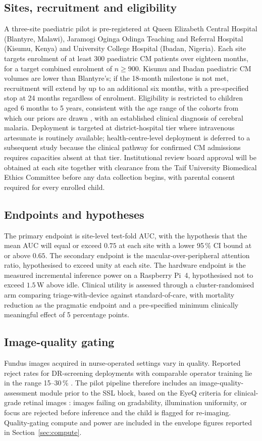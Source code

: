 \documentclass[twocolumn,10pt]{article}
\begin{document}
\subsection{Sites, recruitment and eligibility}
A three-site paediatric pilot is pre-registered at Queen
Elizabeth Central Hospital (Blantyre, Malawi), Jaramogi Oginga
Odinga Teaching and Referral Hospital (Kisumu, Kenya) and
University College Hospital (Ibadan, Nigeria). Each site targets
enrolment of at least 300 paediatric CM patients over eighteen
months, for a target combined enrolment of $n \geq 900$. Kisumu
and Ibadan paediatric CM volumes are lower than Blantyre's; if
the 18-month milestone is not met, recruitment will extend by up
to an additional six months, with a pre-specified stop at
24 months regardless of enrolment. Eligibility is restricted to
children aged 6 months to 5 years, consistent with the age range
of the cohorts from which our priors are drawn
\cite{Beare2006,Beare2009}, with an established clinical
diagnosis of cerebral malaria. Deployment is targeted at
district-hospital tier where intravenous artesunate is routinely
available; health-centre-level deployment is deferred to a
subsequent study because the clinical pathway for confirmed CM
admissions requires capacities absent at that tier.
Institutional review board approval will be obtained at each
site together with clearance from the Taif University Biomedical
Ethics Committee before any data collection begins, with parental
consent required for every enrolled child.

\subsection{Endpoints and hypotheses}
The primary endpoint is site-level test-fold AUC, with the
hypothesis that the mean AUC will equal or exceed $0.75$ at each
site with a lower 95\,\% CI bound at or above $0.65$. The
secondary endpoint is the macular-over-peripheral attention
ratio, hypothesised to exceed unity at each site. The hardware
endpoint is the measured incremental inference power on a
Raspberry Pi~4, hypothesised not to exceed $1.5$\,W above idle.
Clinical utility is assessed through a cluster-randomised arm
comparing triage-with-device against standard-of-care, with
mortality reduction as the pragmatic endpoint and a pre-specified
minimum clinically meaningful effect of 5 percentage points.

\subsection{Image-quality gating}
Fundus images acquired in nurse-operated settings vary in
quality. Reported reject rates for DR-screening deployments with
comparable operator training lie in the range 15--30\,\%
\cite{Sahlsten2019}. The pilot pipeline therefore includes an
image-quality-assessment module prior to the SSL block, based on
the EyeQ criteria for clinical-grade retinal images
\cite{Fu2019EyeQ}: images failing on gradability, illumination
uniformity, or focus are rejected before inference and the child
is flagged for re-imaging. Quality-gating compute and power are
included in the envelope figures reported in
Section~\ref{sec:compute}.
\end{document}
